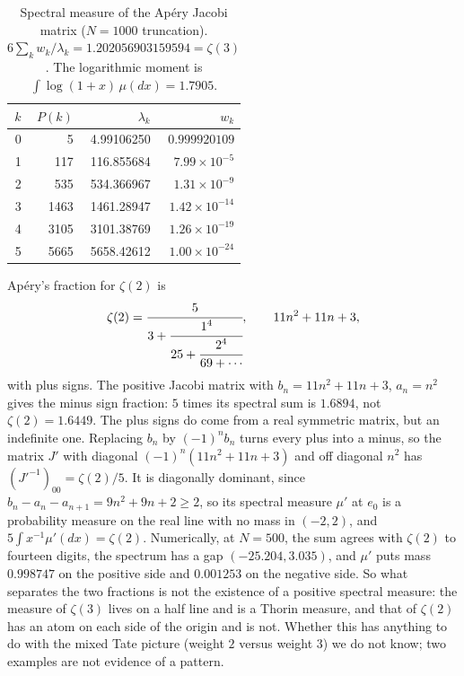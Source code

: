 \begin{table}[h]
\centering
\begin{tabular}{rrrr}
\toprule
$k$ & $P(k)$ & $\lambda_k$ & $w_k$\\
\midrule
0 & 5 & 4.99106250 & $0.999920109$\\
1 & 117 & 116.855684 & $7.99\times10^{-5}$\\
2 & 535 & 534.366967 & $1.31\times10^{-9}$\\
3 & 1463 & 1461.28947 & $1.42\times10^{-14}$\\
4 & 3105 & 3101.38769 & $1.26\times10^{-19}$\\
5 & 5665 & 5658.42612 & $1.00\times10^{-24}$\\
\bottomrule
\end{tabular}
\caption{Spectral measure of the Ap\'ery Jacobi matrix ($N=1000$ truncation). $6\sum_k w_k/\lambda_k=1.202056903159594=\zeta(3)$. The logarithmic moment is $\int\log(1+x)\,\mu(dx)=1.7905$.}
\label{tab:zvapery}
\end{table}

\begin{remark}
Ap\'ery's fraction for $\zeta(2)$ is
\[
\zeta(2)=\cfrac{5}{3+\cfrac{1^4}{25+\cfrac{2^4}{69+\cdots}}},\qquad 11n^2+11n+3,
\]
with plus signs. The positive Jacobi matrix with $b_n=11n^2+11n+3$, $a_n=n^2$ gives the minus sign fraction: $5$ times its spectral sum is $1.6894$, not $\zeta(2)=1.6449$. The plus signs do come from a real symmetric matrix, but an indefinite one. Replacing $b_n$ by $(-1)^nb_n$ turns every plus into a minus, so the matrix $J'$ with diagonal $(-1)^n(11n^2+11n+3)$ and off diagonal $n^2$ has $(J'^{-1})_{00}=\zeta(2)/5$. It is diagonally dominant, since $b_n-a_n-a_{n+1}=9n^2+9n+2\ge2$, so its spectral measure $\mu'$ at $e_0$ is a probability measure on the real line with no mass in $(-2,2)$, and $5\int x^{-1}\mu'(dx)=\zeta(2)$. Numerically, at $N=500$, the sum agrees with $\zeta(2)$ to fourteen digits, the spectrum has a gap $(-25.204,3.035)$, and $\mu'$ puts mass $0.998747$ on the positive side and $0.001253$ on the negative side. So what separates the two fractions is not the existence of a positive spectral measure: the measure of $\zeta(3)$ lives on a half line and is a Thorin measure, and that of $\zeta(2)$ has an atom on each side of the origin and is not. Whether this has anything to do with the mixed Tate picture (weight $2$ versus weight $3$) we do not know; two examples are not evidence of a pattern.
\end{remark}

